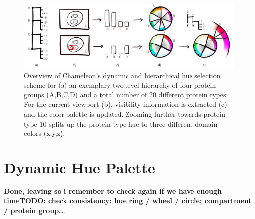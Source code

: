 \documentclass{egpubl}
\begin{document}
		\begin{figure}[t]
			\centering
			\includegraphics[width=0.95\linewidth]{Figures/coloroverview}
			\caption{Overview of Chameleon's dynamic and hierarchical hue selection scheme for (a) an exemplary two-level hierarchy of four protein groups (A,B,C,D) and a total number of 20 different protein types: For the current viewport (b), visibility information is extracted (c) and the color palette is updated. Zooming further towards protein type 10 splits up the protein type hue to three different domain colors (x,y,z).}
			\label{fig:coloroverview}
		\end{figure}
	
	\section{Dynamic Hue Palette}
	\label{sec:hue}
	
	\textbf{Done, leaving so i remember to check again if we have enough timeTODO: check consistency: hue ring / wheel / circle; compartment / protein group...} 
	
\end{document}
